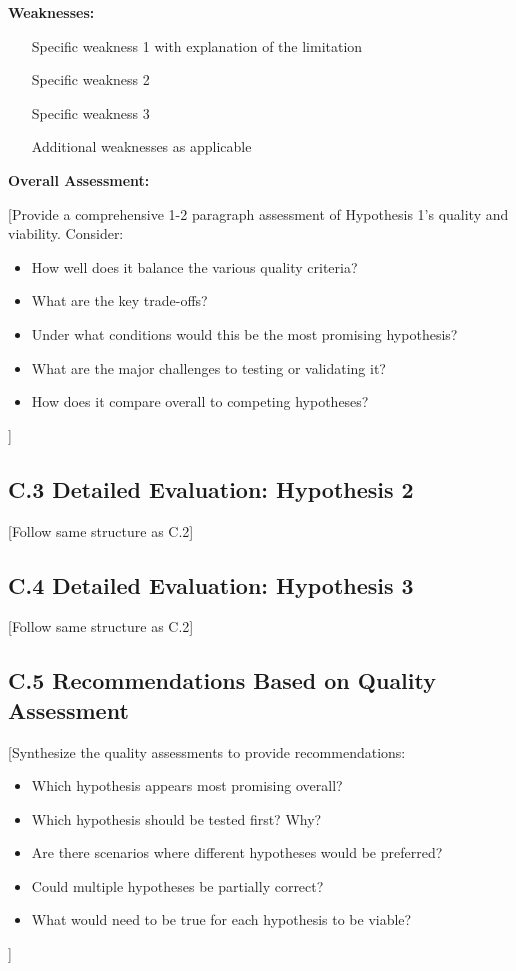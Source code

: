 \documentclass[11pt,letterpaper]{article}
\begin{document}
\textbf{Weaknesses:}
\begin{enumerate}
  \item [Specific weakness 1 with explanation of the limitation]
  \item [Specific weakness 2]
  \item [Specific weakness 3]
  \item [Additional weaknesses as applicable]
\end{enumerate}

\textbf{Overall Assessment:}

[Provide a comprehensive 1-2 paragraph assessment of Hypothesis 1's quality and viability. Consider:
\begin{itemize}
  \item How well does it balance the various quality criteria?
  \item What are the key trade-offs?
  \item Under what conditions would this be the most promising hypothesis?
  \item What are the major challenges to testing or validating it?
  \item How does it compare overall to competing hypotheses?
\end{itemize}]

\subsection*{C.3 Detailed Evaluation: Hypothesis 2}

[Follow same structure as C.2]

\subsection*{C.4 Detailed Evaluation: Hypothesis 3}

[Follow same structure as C.2]


\subsection*{C.5 Recommendations Based on Quality Assessment}

[Synthesize the quality assessments to provide recommendations:
\begin{itemize}
  \item Which hypothesis appears most promising overall?
  \item Which hypothesis should be tested first? Why?
  \item Are there scenarios where different hypotheses would be preferred?
  \item Could multiple hypotheses be partially correct?
  \item What would need to be true for each hypothesis to be viable?
\end{itemize}]
\end{document}
